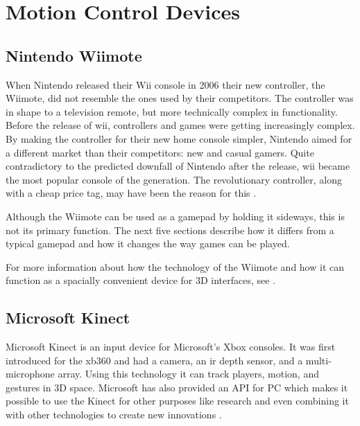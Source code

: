 

\section{Motion Control Devices}
\subsection{Nintendo Wiimote}
\label{wiimote}
When Nintendo released their Wii console in 2006 \cite{overmars2012} their new controller, the Wiimote, did not resemble the ones used by their competitors.
The controller was in shape to a television remote, but more technically complex in functionality.
Before the release of \gls{wii}, controllers and games were getting increasingly complex.
By making the controller for their new home console simpler, Nintendo aimed for a different market than their competitors: new and casual gamers.
Quite contradictory to the predicted downfall of Nintendo after the release, \gls{wii} became the most popular console of the generation.
The revolutionary controller, along with a cheap price tag, may have been the reason for this \cite{overmars2012}.

Although the Wiimote can be used as a gamepad by holding it sideways, this is not its primary function. %
The next five sections describe how it differs from a typical gamepad and how it changes the way games can be played. %

For more information about how the technology of the Wiimote and how it can function as a spacially convenient device for 3D interfaces, see \cite{lee2008hacking,wingrave2010wiimote}.

\subsection{Microsoft Kinect}
Microsoft Kinect is an input device for Microsoft's Xbox consoles.
It was first introduced for the \gls{xb360} and had a camera, an \gls{ir} depth sensor, and a multi-microphone array. %
Using this technology it can track players, motion, and gestures in 3D space. %
Microsoft has also provided an API for PC which makes it possible to use the Kinect for other purposes like research and even combining it with other technologies to create new innovations \cite{2015kinect}.

